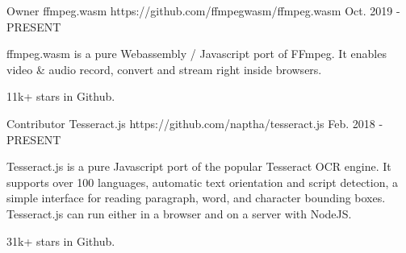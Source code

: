 

\begin{cventries}

  \cventry
    {Owner} %
    {ffmpeg.wasm} %
    {https://github.com/ffmpegwasm/ffmpeg.wasm} %
    {Oct. 2019 - PRESENT} %
    {
      \begin{cvitems} %
        \item {ffmpeg.wasm is a pure Webassembly / Javascript port of FFmpeg. It enables video \& audio record, convert and stream right inside browsers.}
        \item {11k+ stars in Github.}
      \end{cvitems}
    }

  \cventry
    {Contributor} %
    {Tesseract.js} %
    {https://github.com/naptha/tesseract.js} %
    {Feb. 2018 - PRESENT} %
    {
      \begin{cvitems} %
        \item {Tesseract.js is a pure Javascript port of the popular Tesseract OCR engine. It supports over 100 languages, automatic text orientation and script detection, a simple interface for reading paragraph, word, and character bounding boxes. Tesseract.js can run either in a browser and on a server with NodeJS.}
        \item {31k+ stars in Github.}
      \end{cvitems}
    }



\end{cventries}
